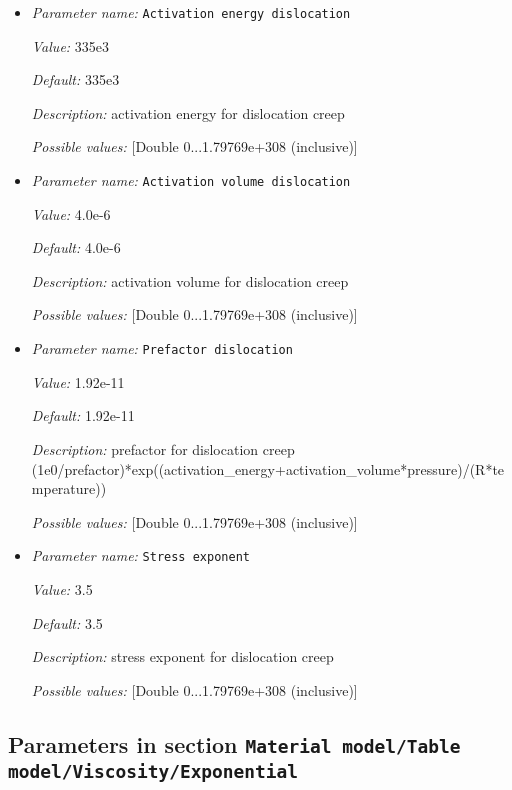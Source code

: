 \begin{itemize}
\item {\it Parameter name:} {\tt Activation energy dislocation}


{\it Value:} 335e3


{\it Default:} 335e3


{\it Description:} activation energy for dislocation creep


{\it Possible values:} [Double 0...1.79769e+308 (inclusive)]
\item {\it Parameter name:} {\tt Activation volume dislocation}


{\it Value:} 4.0e-6


{\it Default:} 4.0e-6


{\it Description:} activation volume for dislocation creep


{\it Possible values:} [Double 0...1.79769e+308 (inclusive)]
\item {\it Parameter name:} {\tt Prefactor dislocation}


{\it Value:} 1.92e-11


{\it Default:} 1.92e-11


{\it Description:} prefactor for dislocation creep (1e0/prefactor)*exp((activation\_energy+activation\_volume*pressure)/(R*temperature))


{\it Possible values:} [Double 0...1.79769e+308 (inclusive)]
\item {\it Parameter name:} {\tt Stress exponent}


{\it Value:} 3.5


{\it Default:} 3.5


{\it Description:} stress exponent for dislocation creep


{\it Possible values:} [Double 0...1.79769e+308 (inclusive)]
\end{itemize}

\subsection{Parameters in section \tt Material model/Table model/Viscosity/Exponential}
\label{parameters:Material_20model/Table_20model/Viscosity/Exponential}

